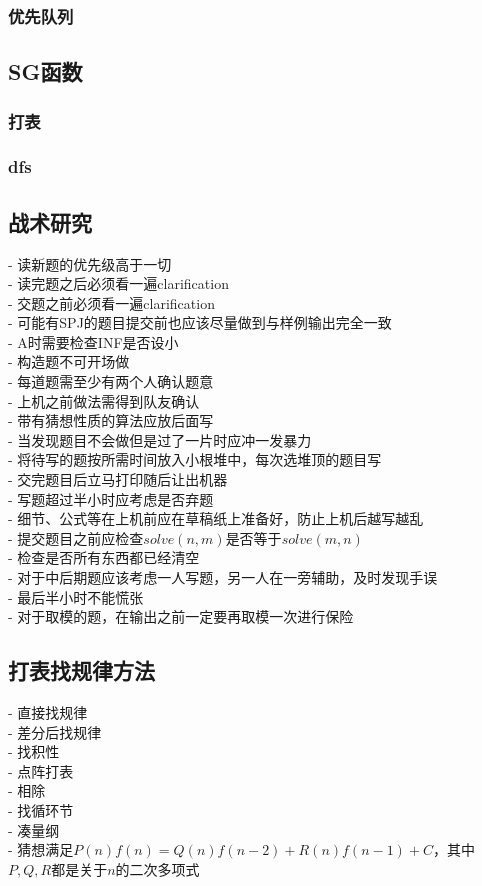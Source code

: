 \documentclass[twocolumn,a4]{article}%
\begin{document}
    \subsubsection{优先队列}
    
\subsection{SG函数}
    
    \subsubsection{打表}
    
    \subsubsection{dfs}
    
\subsection{战术研究}
    - 读新题的优先级高于一切\\
    - 读完题之后必须看一遍clarification\\
    - 交题之前必须看一遍clarification\\
    - 可能有SPJ的题目提交前也应该尽量做到与样例输出完全一致\\
    - A时需要检查INF是否设小\\
    - 构造题不可开场做\\
    - 每道题需至少有两个人确认题意\\
    - 上机之前做法需得到队友确认\\
    - 带有猜想性质的算法应放后面写\\
    - 当发现题目不会做但是过了一片时应冲一发暴力\\
    - 将待写的题按所需时间放入小根堆中，每次选堆顶的题目写\\
    - 交完题目后立马打印随后让出机器\\
    - 写题超过半小时应考虑是否弃题\\
    - 细节、公式等在上机前应在草稿纸上准备好，防止上机后越写越乱\\
    - 提交题目之前应检查$solve(n,m)$是否等于$solve(m,n)$\\
    - 检查是否所有东西都已经清空\\
    - 对于中后期题应该考虑一人写题，另一人在一旁辅助，及时发现手误\\
    - 最后半小时不能慌张\\
    - 对于取模的题，在输出之前一定要再取模一次进行保险\\
\subsection{打表找规律方法}
    - 直接找规律\\
    - 差分后找规律\\
    - 找积性\\
    - 点阵打表\\
    - 相除\\
    - 找循环节\\
    - 凑量纲\\
    - 猜想满足$P(n)f(n)=Q(n)f(n−2)+R(n)f(n−1)+C$，其中$P,Q,R$都是关于$n$的二次多项式\\
\end{document}
